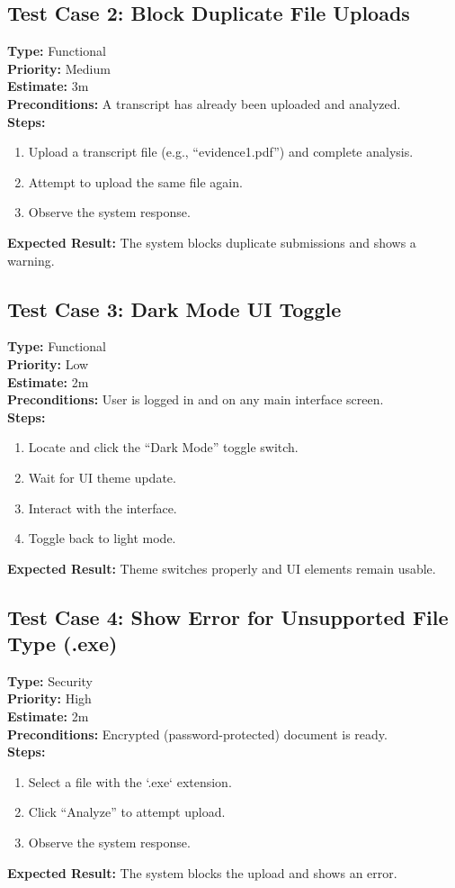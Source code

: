 \documentclass[12pt]{article}
\begin{document}
\subsection*{Test Case 2: Block Duplicate File Uploads}
\textbf{Type:} Functional \\
\textbf{Priority:} Medium \\
\textbf{Estimate:} 3m \\
\textbf{Preconditions:} A transcript has already been uploaded and analyzed. \\
\textbf{Steps:}
\begin{enumerate}[label=\arabic*.]
\item Upload a transcript file (e.g., “evidence1.pdf”) and complete analysis.
\item Attempt to upload the same file again.
\item Observe the system response.
\end{enumerate}
\textbf{Expected Result:} The system blocks duplicate submissions and shows a warning.

\subsection*{Test Case 3: Dark Mode UI Toggle}
\textbf{Type:} Functional \\
\textbf{Priority:} Low \\
\textbf{Estimate:} 2m \\
\textbf{Preconditions:} User is logged in and on any main interface screen. \\
\textbf{Steps:}
\begin{enumerate}[label=\arabic*.]
\item Locate and click the “Dark Mode” toggle switch.
\item Wait for UI theme update.
\item Interact with the interface.
\item Toggle back to light mode.
\end{enumerate}
\textbf{Expected Result:} Theme switches properly and UI elements remain usable.

\subsection*{Test Case 4: Show Error for Unsupported File Type (.exe)}
\textbf{Type:} Security \\
\textbf{Priority:} High \\
\textbf{Estimate:} 2m \\
\textbf{Preconditions:} Encrypted (password-protected) document is ready. \\
\textbf{Steps:}
\begin{enumerate}[label=\arabic*.]
\item Select a file with the `.exe` extension.
\item Click “Analyze” to attempt upload.
\item Observe the system response.
\end{enumerate}
\textbf{Expected Result:} The system blocks the upload and shows an error.
\end{document}

